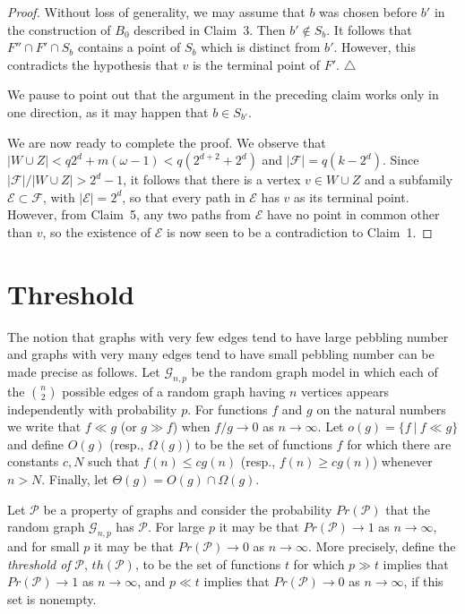 \documentclass{amsart}
\theoremstyle{remark}
\newcommand{\gnp}{\mathcal{G}_{n,p}}
\newcommand{\cgQ}{\mathcal{P}}
\begin{document}
\begin{proof}
Without loss of generality, we may assume that $b$ was chosen
before $b'$ in the construction of $B_0$ described in
Claim~3.  Then $b'\not\in S_b$.  It follows that $F''\cap F'\cap S_b$
contains a point of $S_b$ which is distinct from $b'$.
However, this contradicts the hypothesis that $v$ is the
terminal point of $F'$.
\hfill$\triangle$

\medskip
We pause to point out that the argument in the preceding claim
works only in one direction, as it may happen that
$b\in S_{b'}$.


\medskip
We are now ready to complete the proof.  We observe that
$|W\cup Z| <q2^d+m(\omega-1)<q(2^{d+2}+2^d)$ and 
$|\mathcal{F}|=q(k-2^d)$.  Since $|\mathcal{F}|/|W\cup Z|>2^d-1$,
it follows that there is a vertex $v\in W\cup Z$ and a subfamily
$\mathcal{E}\subset\mathcal{F}$, with $|\mathcal{E}|=2^d$, so
that every path in $\mathcal{E}$ has $v$ as its terminal point.
However, from Claim~5,
any two paths from $\mathcal{E}$ have no 
point in common other than $v$, so the existence
of $\mathcal{E}$ is now seen to be a contradiction to
Claim~1.
\end{proof}
\section{Threshold}\label{s:thresh}
The notion that graphs with very few edges tend to have large pebbling
number and graphs with very many edges tend to have small pebbling
number can be made precise as follows.
Let $\gnp$ be the random graph model in which each of the $n\choose 2$ 
possible edges of a random graph having $n$ vertices appears independently 
with probability $p$.
For functions $f$ and $g$ on the natural numbers we write that
$f\ll g$ (or $g\gg f$) when $f/g\rightarrow 0$ as $n\rightarrow\infty$.
Let $o(g)=\{f\ |\ f\ll g\}$ and define $O(g)$ (resp., $\Omega(g)$) to be 
the set of functions $f$ for which there are constants $c, N$ such that
$f(n)\le cg(n)$ (resp., $f(n)\ge cg(n)$) whenever $n>N$.
Finally, let $\Theta(g)=O(g)\cap\Omega(g)$.

Let $\cgQ$ be a property of graphs and consider the probability
$Pr(\cgQ)$ that the random graph $\gnp$ has $\cgQ$.
For large $p$ it may be that $Pr(\cgQ)\rightarrow 1$ as 
$n\rightarrow\infty$, and for small $p$ it may be that 
$Pr(\cgQ)\rightarrow 0$ as $n\rightarrow\infty$.
More precisely, define the \textit{threshold of} $\cgQ$, $th(\cgQ)$, 
to be the set of functions $t$ for which $p\gg t$ implies that
$Pr(\cgQ)\rightarrow 1$ as $n\rightarrow\infty$, and $p\ll t$ implies that
$Pr(\cgQ)\rightarrow 0$ as $n\rightarrow\infty$, if this set is nonempty.
\end{document}
